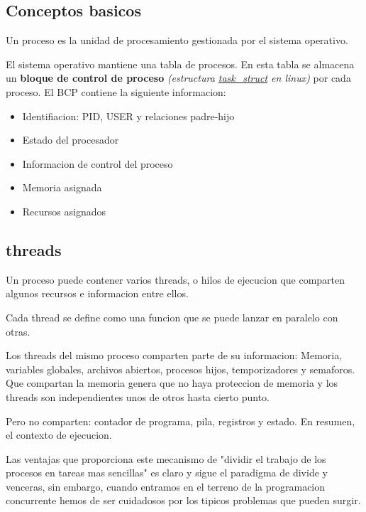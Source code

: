 \documentclass[12pt, letterpaper]{article}
\begin{document}
\subsection{Conceptos basicos}
Un proceso es la unidad de procesamiento gestionada por el sistema operativo.\par
El sistema operativo mantiene una tabla de procesos. En esta tabla se almacena un \textbf{bloque de control de proceso} \textit{(estructura \href{https://github.com/torvalds/linux/blob/master/include/linux/sched.h}{task\_struct} en linux)} por cada proceso.
El BCP contiene la siguiente informacion:
\begin{itemize}
	\item{Identifiacion: PID, USER y relaciones padre-hijo}
	\item{Estado del procesador}
	\item{Informacion de control del proceso}
	\item{Memoria asignada}
	\item{Recursos asignados}
\end{itemize}

\subsection{threads}

Un proceso puede contener varios threads, o hilos de ejecucion que comparten algunos recursos e informacion entre ellos.\par

Cada thread se define como una funcion que se puede lanzar en paralelo con otras.\par

Los threads del mismo proceso comparten parte de su informacion: Memoria, variables globales, archivos abiertos, procesos hijos, temporizadores y semaforos. Que compartan la memoria genera que no haya proteccion de memoria y los threads son independientes unos de otros hasta cierto punto.\par
Pero no comparten: contador de programa, pila, registros y estado. En resumen, el contexto de ejecucion.\par

Las ventajas que proporciona este mecanismo de "dividir el trabajo de los procesos en tareas mas sencillas" es claro y sigue el paradigma de divide y venceras, sin embargo, cuando entramos en el terreno de la programacion concurrente hemos de ser cuidadosos por los tipicos problemas que pueden surgir.\par
\end{document}
